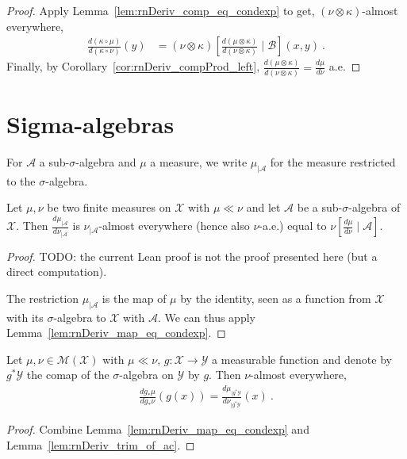 \begin{proof}\leanok
{}
Apply Lemma~\ref{lem:rnDeriv_comp_eq_condexp} to get, $(\nu \otimes \kappa)$-almost everywhere,
\begin{align*}
\frac{d(\kappa \circ \mu)}{d(\kappa \circ \nu)}(y)
&= (\nu \otimes \kappa)\left[ \frac{d (\mu \otimes \kappa)}{d (\nu \otimes \kappa)} \mid \mathcal B\right](x,y)
\: .
\end{align*}
Finally, by Corollary~\ref{cor:rnDeriv_compProd_left}, $\frac{d (\mu \otimes \kappa)}{d (\nu \otimes \kappa)} = \frac{d \mu}{d \nu}$ a.e.
\end{proof}


\section{Sigma-algebras}

For $\mathcal A$ a sub-$\sigma$-algebra and $\mu$ a measure, we write $\mathcal \mu_{| \mathcal A}$ for the measure restricted to the $\sigma$-algebra.

\begin{lemma}
  \label{lem:rnDeriv_trim_of_ac}
  \leanok
  Let $\mu, \nu$ be two finite measures on $\mathcal X$ with $\mu \ll \nu$ and let $\mathcal A$ be a sub-$\sigma$-algebra of $\mathcal X$.
  Then $\frac{d \mu_{| \mathcal A}}{d \nu_{| \mathcal A}}$ is $\nu_{| \mathcal A}$-almost everywhere (hence also $\nu$-a.e.) equal to $\nu\left[ \frac{d \mu}{d \nu} \mid \mathcal A\right]$.
\end{lemma}

\begin{proof}\leanok
{}
TODO: the current Lean proof is not the proof presented here (but a direct computation).

The restriction $\mu_{| \mathcal A}$ is the map of $\mu$ by the identity, seen as a function from $\mathcal X$ with its $\sigma$-algebra to $\mathcal X$ with $\mathcal{A}$.
We can thus apply Lemma~\ref{lem:rnDeriv_map_eq_condexp}.
\end{proof}


\begin{lemma}
  \label{lem:rnDeriv_map_eq_rnDeriv_trim}
  \uses{}
  Let $\mu, \nu \in \mathcal M(\mathcal X)$ with $\mu \ll \nu$, $g : \mathcal X \to \mathcal Y$ a measurable function and denote by $g^* \mathcal Y$ the comap of the $\sigma$-algebra on $\mathcal Y$ by $g$.
  Then $\nu$-almost everywhere,
  \begin{align*}
  \frac{d g_*\mu}{d g_*\nu}(g(x)) = \frac{d \mu_{| g^* \mathcal Y}}{d \nu_{| g^* \mathcal Y}}(x)
  \: .
  \end{align*}
\end{lemma}

\begin{proof}%
{}
Combine Lemma~\ref{lem:rnDeriv_map_eq_condexp} and Lemma~\ref{lem:rnDeriv_trim_of_ac}.
\end{proof}